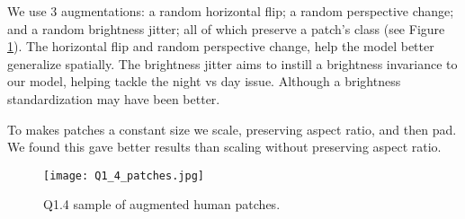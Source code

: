 We use 3 augmentations: a random horizontal flip; a random perspective change; and a random brightness jitter; all of which preserve a patch's class (see Figure \ref{fig:Q1_4}).
The horizontal flip and random perspective change, help the model better generalize spatially.
The brightness jitter aims to instill a brightness invariance to our model, helping tackle the night vs day issue.
Although a brightness standardization may have been better.

To makes patches a constant size we scale, preserving aspect ratio, and then pad.
We found this gave better results than scaling without preserving aspect ratio.

\begin{figure}[h!]
  \begin{center}
  \texttt{[image: Q1\_4\_patches.jpg]}
    \caption{Q1.4 sample of augmented human patches.}
    \label{fig:Q1_4}
  \end{center}
  \end{figure}